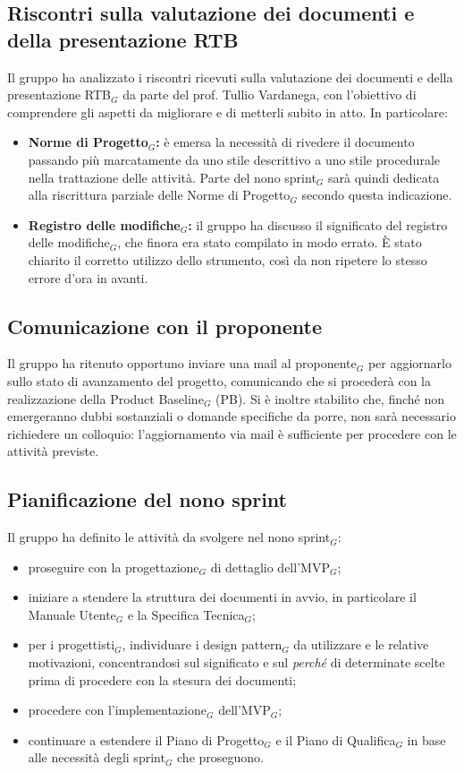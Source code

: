 \documentclass[a4paper, 10pt, colorlinks=true, linkcolor=black, urlcolor=blue, citecolor=blue, hidelinks]{article}
\begin{document}
\subsection{Riscontri sulla valutazione dei documenti e della presentazione RTB}
Il gruppo ha analizzato i riscontri ricevuti sulla valutazione dei documenti e della presentazione RTB$_G$ da parte del prof. Tullio Vardanega, con l'obiettivo di comprendere gli aspetti da migliorare e di metterli subito in atto. In particolare:
\begin{itemize}
    \item \textbf{Norme di Progetto$_G$:} è emersa la necessità di rivedere il documento passando più marcatamente da uno stile descrittivo a uno stile procedurale nella trattazione delle attività. Parte del nono sprint$_G$ sarà quindi dedicata alla riscrittura parziale delle Norme di Progetto$_G$ secondo questa indicazione.
    \item \textbf{Registro delle modifiche$_G$:} il gruppo ha discusso il significato del registro delle modifiche$_G$, che finora era stato compilato in modo errato. È stato chiarito il corretto utilizzo dello strumento, così da non ripetere lo stesso errore d'ora in avanti.
\end{itemize}

\subsection{Comunicazione con il proponente}
Il gruppo ha ritenuto opportuno inviare una mail al proponente$_G$ per aggiornarlo sullo stato di avanzamento del progetto, comunicando che si procederà con la realizzazione della Product Baseline$_G$ (PB). Si è inoltre stabilito che, finché non emergeranno dubbi sostanziali o domande specifiche da porre, non sarà necessario richiedere un colloquio: l'aggiornamento via mail è sufficiente per procedere con le attività previste.

\subsection{Pianificazione del nono sprint}
Il gruppo ha definito le attività da svolgere nel nono sprint$_G$:
\begin{itemize}
    \item proseguire con la progettazione$_G$ di dettaglio dell'MVP$_G$;
    \item iniziare a stendere la struttura dei documenti in avvio, in particolare il Manuale Utente$_G$ e la Specifica Tecnica$_G$;
    \item per i progettisti$_G$, individuare i design pattern$_G$ da utilizzare e le relative motivazioni, concentrandosi sul significato e sul \emph{perché} di determinate scelte prima di procedere con la stesura dei documenti;
    \item procedere con l'implementazione$_G$ dell'MVP$_G$;
    \item continuare a estendere il Piano di Progetto$_G$ e il Piano di Qualifica$_G$ in base alle necessità degli sprint$_G$ che proseguono.
\end{itemize}
\end{document}
